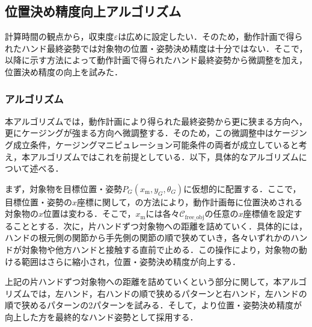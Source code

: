 \documentclass[a4paper,twoside,12pt,papersize, dvipdfmx]{iirthesis}
\begin{document}
\subsection{位置決め精度向上アルゴリズム}{\label{subsec::planner::formclosure}
計算時間の観点から，収束度$\varepsilon$は広めに設定したい．そのため，動作計画で得られたハンド最終姿勢では対象物の位置・姿勢決め精度は十分ではない．そこで，以降に示す方法によって動作計画で得られたハンド最終姿勢から微調整を加え，位置決め精度の向上を試みた．
\subsubsection{アルゴリズム}
本アルゴリズムでは，動作計画により得られた最終姿勢から更に狭まる方向へ，更にケージングが強まる方向へ微調整する．そのため，この微調整中はケージング成立条件，ケージングマニピュレーション可能条件の両者が成立していると考え，本アルゴリズムではこれを前提としている．以下，具体的なアルゴリズムについて述べる．\par
まず，対象物を目標位置・姿勢$P_G (x_{\mathrm m}, y_G, \theta_G)$に仮想的に配置する．ここで，目標位置・姿勢の$x$座標に関して，の方法により，動作計画毎に位置決めされる対象物の$x$位置は変わる．そこで，$x_{\mathrm m}$には各々$\mathcal{C}_{\mathrm{free\_obj}}$の任意の$x$座標値を設定することとする．次に，片ハンドずつ対象物への距離を詰めていく．具体的には，ハンドの根元側の関節から手先側の関節の順で狭めていき，各々いずれかのハンドが対象物や他方ハンドと接触する直前で止める．この操作により，対象物の動ける範囲はさらに縮小され，位置・姿勢決め精度が向上する．\par
上記の片ハンドずつ対象物への距離を詰めていくという部分に関して，本アルゴリズムでは，左ハンド，右ハンドの順で狭めるパターンと右ハンド，左ハンドの順で狭めるパターンの2パターンを試みる．そして，より位置・姿勢決め精度が向上した方を最終的なハンド姿勢として採用する．

}
\end{document}
